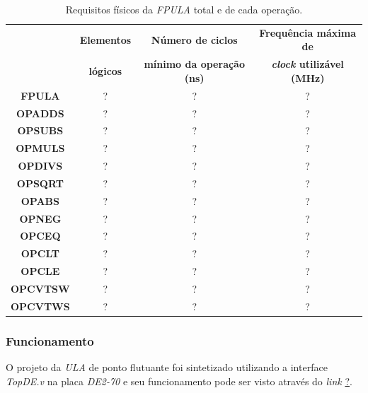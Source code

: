 \documentclass[12pt]{article}
\begin{document}
\begin{table}[H]
	\centering
	\begin{tabular}{|c|c|c|c|}
		\hline
		& \textbf{Elementos} & \textbf{Número de ciclos} & \textbf{Frequência máxima de} \\
		& \textbf{lógicos} & \textbf{mínimo da operação (ns)} & \textbf{\textit{clock} utilizável (MHz)} \\
		\hline
		\textbf{FPULA} & ? & ? & ? \\\hline
		\textbf{OPADDS} & ? & ? & ? \\\hline
		\textbf{OPSUBS} & ? & ? & ? \\\hline
		\textbf{OPMULS} & ? & ? & ? \\\hline
		\textbf{OPDIVS} & ? & ? & ? \\\hline
		\textbf{OPSQRT} & ? & ? & ? \\\hline
		\textbf{OPABS} & ? & ? & ? \\\hline
		\textbf{OPNEG} & ? & ? & ? \\\hline
		\textbf{OPCEQ} & ? & ? & ? \\\hline
		\textbf{OPCLT} & ? & ? & ? \\\hline
		\textbf{OPCLE} & ? & ? & ? \\\hline
		\textbf{OPCVTSW} & ? & ? & ? \\\hline
		\textbf{OPCVTWS} & ? & ? & ? \\\hline
	\end{tabular}
	\caption{Requisitos físicos da \textit{FPULA} total e de cada operação.}
	\label{tab:req3}
\end{table}

\subsubsection{Funcionamento}
\label{subsubsec:fpulafunc}

O projeto da \textit{ULA} de ponto flutuante foi sintetizado utilizando a interface \textit{TopDE.v} na placa \textit{DE2-70} e seu funcionamento pode ser visto através do \textit{link} \url{?}. 



\end{document}
